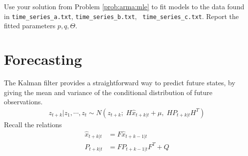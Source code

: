 \begin{problem}
\label{prob:arma:data}
Use your solution from Problem \ref{prob:arma:mle} to fit models to the data
found in {\tt time\_series\_a.txt}, {\tt time\_series\_b.txt}, {\tt
time\_series\_c.txt}. Report the fitted parameters $p, q, \Theta$.
\end{problem}

\section*{Forecasting}
The Kalman filter provides a straightforward way to predict future states, by
giving the mean and variance of the conditional distribution of future
observations.
\begin{align}
    z_{t + k} | z_{1}, \cdots, z_{t} \sim N(z_{t+k};\; H\hat{x}_{t+k|t} + \mu,\;
    HP_{t+k|t}H^T)
\end{align}
Recall the relations
\begin{align}
    \hat{x}_{t+k|t} &= F\hat{x}_{t+k-1|t}\\
    P_{t+k|t} &= FP_{t+k-1|t}F^T + Q
\end{align}

